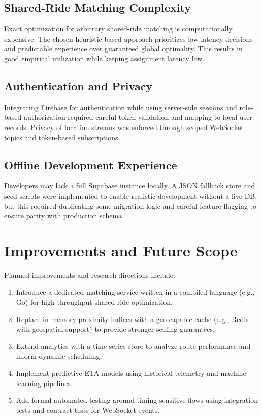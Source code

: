 \documentclass[12pt,a4paper]{article}
\begin{document}
\subsection{Shared-Ride Matching Complexity}
Exact optimization for arbitrary shared-ride matching is computationally expensive. The chosen heuristic-based approach prioritizes low-latency decisions and predictable experience over guaranteed global optimality. This results in good empirical utilization while keeping assignment latency low.

\subsection{Authentication and Privacy}
Integrating Firebase for authentication while using server-side sessions and role-based authorization required careful token validation and mapping to local user records. Privacy of location streams was enforced through scoped WebSocket topics and token-based subscriptions.

\subsection{Offline Development Experience}
Developers may lack a full Supabase instance locally. A JSON fallback store and seed scripts were implemented to enable realistic development without a live DB, but this required duplicating some migration logic and careful feature-flagging to ensure parity with production schema.

\section{Improvements and Future Scope}
Planned improvements and research directions include:

\begin{enumerate}[leftmargin=*]
  \item Introduce a dedicated matching service written in a compiled language (e.g., Go) for high-throughput shared-ride optimization.
  \item Replace in-memory proximity indices with a geo-capable cache (e.g., Redis with geospatial support) to provide stronger scaling guarantees.
  \item Extend analytics with a time-series store to analyze route performance and inform dynamic scheduling.
  \item Implement predictive ETA models using historical telemetry and machine learning pipelines.
  \item Add formal automated testing around timing-sensitive flows using integration tests and contract tests for WebSocket events.
\end{enumerate}
\end{document}
